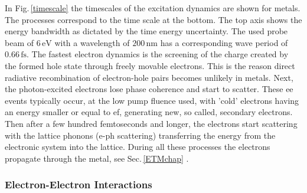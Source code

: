 \documentclass[a4paper,12pt,twoside]{article}
\begin{document}
In Fig.\,\ref{timescale} the timescales of the excitation dynamics are shown for metals. The processes correspond to the time scale at the bottom.
The top axis shows the energy bandwidth as dictated by the time energy uncertainty. The used probe beam of $6\,\mathrm{eV}$ with a wavelength of $200\,\mathrm{\mbox{nm}}$ has a corresponding wave period of $0.66\,\mathrm{\mbox{fs}}$.
The fastest electron dynamics is the screening of the charge created by the formed hole state through freely movable electrons. This is the reason direct radiative recombination of electron-hole pairs becomes unlikely in metals. Next, the photon-excited electrons lose phase coherence and start to scatter.
These \gls{ee} events typically occur, at the low pump fluence used, with 'cold' electrons having an energy smaller or equal to \gls{ef}, generating new, so called, secondary electrons. Then after a few hundred femtoseconds and longer, the electrons start scattering with the lattice phonons (e-ph scattering) transferring the energy from the electronic system into the lattice. During all these processes the electrons propagate through the metal, see Sec.\,\ref{ETMchap} \cite{Bauer2015}.
    
            \subsubsection{Electron-Electron Interactions}
                \label{EEIchap}
\end{document}
